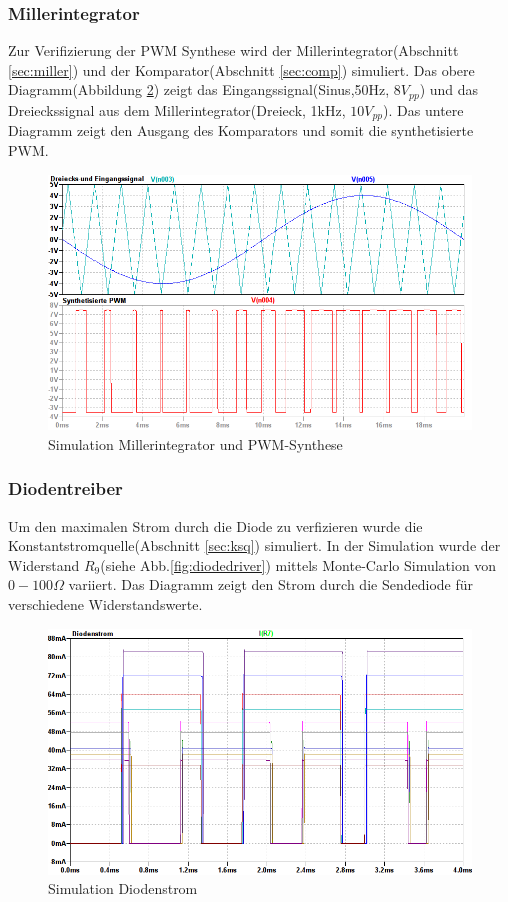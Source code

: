 \subsubsection{Millerintegrator}
\label{sec:simMiller}
Zur Verifizierung der PWM Synthese wird der Millerintegrator(Abschnitt \ref{sec:miller}) und der Komparator(Abschnitt \ref{sec:comp}) simuliert. Das obere Diagramm(Abbildung \ref{fig:pwmSynth}) zeigt das Eingangssignal(Sinus,50Hz, $8V_{pp}$) und das Dreieckssignal aus dem Millerintegrator(Dreieck, 1kHz, $10V_{pp}$). Das untere Diagramm zeigt den Ausgang des Komparators und somit die synthetisierte PWM.
\begin{figure}[H]
\centering
\includegraphics[scale=0.5]{gfx/simTx/PWMsynth.png}
\caption{Simulation Millerintegrator und PWM-Synthese}
	\label{fig:pwmSynth} 
\end{figure}
\subsubsection{Diodentreiber}
Um den maximalen Strom durch die Diode zu verfizieren wurde die Konstantstromquelle(Abschnitt \ref{sec:ksq}) simuliert. In der Simulation wurde der Widerstand $R_9$(siehe Abb.\ref{fig:diodedriver}) mittels Monte-Carlo Simulation von $0 - 100\Omega$ variiert. Das Diagramm zeigt den Strom durch die Sendediode für verschiedene Widerstandswerte.
\begin{figure}[H]
\centering
\includegraphics[scale=0.5]{gfx/simTx/DiodeCurrent.png}
\caption{Simulation Diodenstrom}
	\label{fig:pwmSynth} 
\end{figure}

